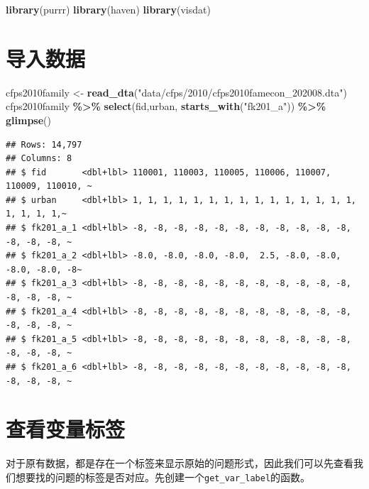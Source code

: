 \documentclass[
  oneside]{book}
\newenvironment{Shaded}{\begin{snugshade}}{\end{snugshade}}
\newcommand{\FunctionTok}[1]{\textcolor[rgb]{0.13,0.29,0.53}{\textbf{#1}}}
\newcommand{\NormalTok}[1]{#1}
\newcommand{\OtherTok}[1]{\textcolor[rgb]{0.56,0.35,0.01}{#1}}
\newcommand{\SpecialCharTok}[1]{\textcolor[rgb]{0.81,0.36,0.00}{\textbf{#1}}}
\newcommand{\StringTok}[1]{\textcolor[rgb]{0.31,0.60,0.02}{#1}}
\begin{document}
\begin{Shaded}
\begin{Highlighting}[]
\FunctionTok{library}\NormalTok{(purrr)}
\FunctionTok{library}\NormalTok{(haven)}
\FunctionTok{library}\NormalTok{(visdat)}
\end{Highlighting}
\end{Shaded}

\hypertarget{ux5bfcux5165ux6570ux636e}{%
\section{导入数据}\label{ux5bfcux5165ux6570ux636e}}

\begin{Shaded}
\begin{Highlighting}[]
\NormalTok{cfps2010family }\OtherTok{\textless{}{-}} \FunctionTok{read\_dta}\NormalTok{(}\StringTok{"data/cfps/2010/cfps2010famecon\_202008.dta"}\NormalTok{)}
\NormalTok{cfps2010family }\SpecialCharTok{\%\textgreater{}\%}
  \FunctionTok{select}\NormalTok{(fid,urban, }\FunctionTok{starts\_with}\NormalTok{(}\StringTok{"fk201\_a"}\NormalTok{)) }\SpecialCharTok{\%\textgreater{}\%}
  \FunctionTok{glimpse}\NormalTok{()}
\end{Highlighting}
\end{Shaded}

\begin{verbatim}
## Rows: 14,797
## Columns: 8
## $ fid       <dbl+lbl> 110001, 110003, 110005, 110006, 110007, 110009, 110010, ~
## $ urban     <dbl+lbl> 1, 1, 1, 1, 1, 1, 1, 1, 1, 1, 1, 1, 1, 1, 1, 1, 1, 1, 1,~
## $ fk201_a_1 <dbl+lbl> -8, -8, -8, -8, -8, -8, -8, -8, -8, -8, -8, -8, -8, -8, ~
## $ fk201_a_2 <dbl+lbl> -8.0, -8.0, -8.0, -8.0,  2.5, -8.0, -8.0, -8.0, -8.0, -8~
## $ fk201_a_3 <dbl+lbl> -8, -8, -8, -8, -8, -8, -8, -8, -8, -8, -8, -8, -8, -8, ~
## $ fk201_a_4 <dbl+lbl> -8, -8, -8, -8, -8, -8, -8, -8, -8, -8, -8, -8, -8, -8, ~
## $ fk201_a_5 <dbl+lbl> -8, -8, -8, -8, -8, -8, -8, -8, -8, -8, -8, -8, -8, -8, ~
## $ fk201_a_6 <dbl+lbl> -8, -8, -8, -8, -8, -8, -8, -8, -8, -8, -8, -8, -8, -8, ~
\end{verbatim}

\hypertarget{ux67e5ux770bux53d8ux91cfux6807ux7b7e}{%
\section{查看变量标签}\label{ux67e5ux770bux53d8ux91cfux6807ux7b7e}}

对于原有数据，都是存在一个标签来显示原始的问题形式，因此我们可以先查看我们想要找的问题的标签是否对应。先创建一个\texttt{get\_var\_label}的函数。
\end{document}
